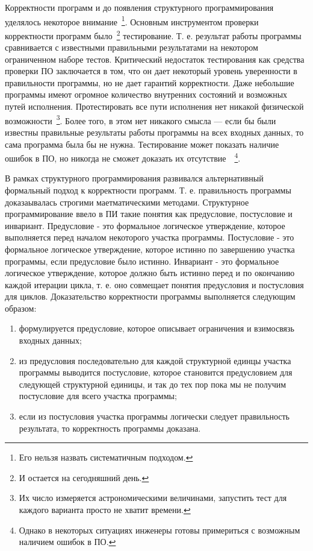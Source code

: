 Корректности программ и до появления структурного программирования уделялось некоторое внимание~\footnote{Его нельзя назвать систематичным подходом.}. Основным инструментом проверки корректности программ было~\footnote{И остается на сегодняшний день.} тестирование. Т. е. результат работы программы сравнивается с известными правильными результатами на некотором ограниченном наборе тестов. Критический недостаток тестирования как средства проверки ПО заключается в том, что он дает некоторый уровень уверенности в правильности программы, но не дает гарантий корректности. Даже небольшие программы имеют огромное количество внутренних состояний и возможных путей исполнения. Протестировать все пути исполнения нет никакой физической возможности~\footnote{Их число измеряется астрономическими величинами, запустить тест для каждого варианта просто не хватит времени.}. Более того, в этом нет никакого смысла — если бы были известны правильные результаты работы программы на всех входных данных, то сама программа была бы не нужна. Тестирование может показать наличие ошибок в ПО, но никогда не сможет доказать их отсутствие~\cite{Dijkstra:1972:CIN}~\footnote{Однако в некоторых ситуациях инженеры готовы примериться с возможным наличием ошибок в ПО.}.

В рамках структурного программирования развивался альтернативный формальный подход к корректности программ. Т. е. правильность программы доказаывалась строгими маетматическими методами. Структурное программирование ввело в ПИ такие понятия как предусловие, постусловие и инвариант. Предусловие - это формальное логическое утверждение, которое выполняется перед началом некоторого участка программы. Постусловие - это формальное логическое утверждение, которое истинно по завершению участка программы, если предусловие было истинно. Инвариант - это формальное логическое утверждение, которое должно быть истинно перед и по окончанию каждой итерации цикла, т. е. оно совмещает понятия предусловия и постусловия для циклов. Доказательство корректности программы выполняется следующим образом:
\begin{enumerate}
  \item формулируется предусловие, которое описывает ограничения и взимосвязь входных данных;
  \item из предусловия последовательно для каждой структурной единцы участка программы выводится постусловие, которое становится предусловием для следующей структурной единицы, и так до тех пор пока мы не получим постусловие для всего участка программы;
  \item если из постусловия участка программы логически следует правильность результата, то корректность программы доказана.
\end{enumerate}

